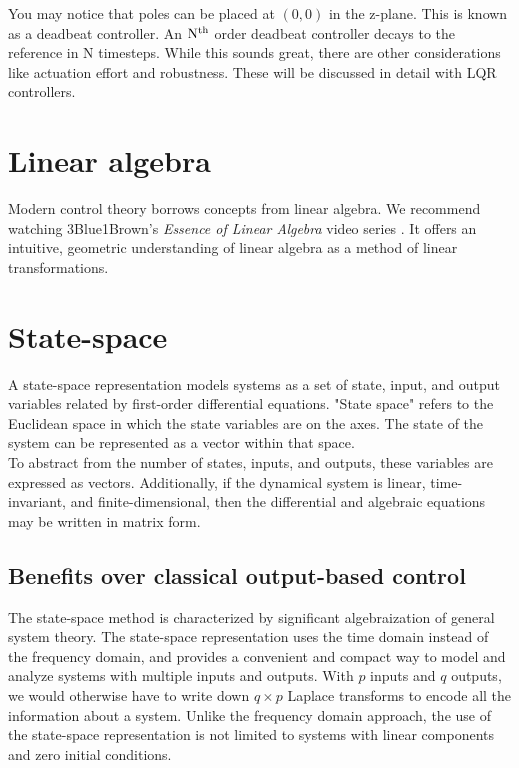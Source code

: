 \documentclass[10pt,conference,compsoc]{IEEEtran}
\begin{document}
\noindent You may notice that poles can be placed at $(0, 0)$ in the z-plane.
This is known as a deadbeat controller. An $\rm N^{th}$ order deadbeat controller
decays to the reference in N timesteps. While this sounds great, there are other
considerations like actuation effort and robustness. These will be discussed in
detail with LQR controllers.

\section{Linear algebra}

\noindent Modern control theory borrows concepts from linear algebra. We
recommend watching 3Blue1Brown's \textit{Essence of Linear Algebra} video series
\cite{bib:essence_of_linalg}. It offers an intuitive, geometric understanding of
linear algebra as a method of linear transformations.

\section{State-space}

\noindent A state-space representation models systems as a set of state, input,
and output variables related by first-order differential equations. "State
space" refers to the Euclidean space in which the state variables are on the
axes. The state of the system can be represented as a vector within that space.
\\

\noindent To abstract from the number of states, inputs, and outputs, these
variables are expressed as vectors. Additionally, if the dynamical system is
linear, time-invariant, and finite-dimensional, then the differential and
algebraic equations may be written in matrix form.

\subsection{Benefits over classical output-based control}

\noindent The state-space method is characterized by significant algebraization
of general system theory. The state-space representation uses the time domain
instead of the frequency domain, and provides a convenient and compact way to
model and analyze systems with multiple inputs and outputs. With $p$ inputs and
$q$ outputs, we would otherwise have to write down $q \times p$ Laplace
transforms to encode all the information about a system. Unlike the frequency
domain approach, the use of the state-space representation is not limited to
systems with linear components and zero initial conditions.
\end{document}
